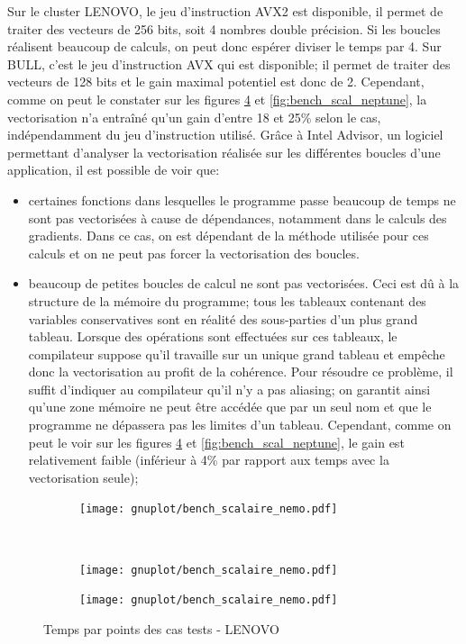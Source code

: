Sur le cluster LENOVO, le jeu d'instruction AVX2 est disponible, il permet de traiter des vecteurs de 256 bits, soit 4 nombres double précision. Si les boucles réalisent beaucoup de calculs, on peut donc espérer diviser le temps par 4. Sur BULL, c'est le jeu d'instruction AVX qui est disponible; il permet de traiter des vecteurs de 128 bits et le gain maximal potentiel est donc de 2. Cependant, comme on peut le constater sur les figures \ref{fig:bench_scal_nemo} et \ref{fig:bench_scal_neptune}, la vectorisation n'a entraîné qu'un gain d'entre 18 et 25\% selon le cas, indépendamment du jeu d'instruction utilisé. Grâce à Intel Advisor, un logiciel permettant d'analyser la vectorisation réalisée sur les différentes boucles d'une application, il est possible de voir que:
\begin{itemize}
\item certaines fonctions dans lesquelles le programme passe beaucoup de temps ne sont pas vectorisées à cause de dépendances, notamment dans le calculs des gradients. Dans ce cas, on est dépendant de la méthode utilisée pour ces calculs et on ne peut pas forcer la vectorisation des boucles.
\item beaucoup de petites boucles de calcul ne sont pas vectorisées. Ceci est dû à la structure de la mémoire du programme; tous les tableaux contenant des variables conservatives sont en réalité des sous-parties d'un plus grand tableau. Lorsque des opérations sont effectuées sur ces tableaux, le compilateur suppose qu'il travaille sur un unique grand tableau et empêche donc la vectorisation au profit de la cohérence. Pour résoudre ce problème, il suffit d'indiquer au compilateur qu'il n'y a pas aliasing; on garantit ainsi qu'une zone mémoire ne peut être accédée que par un seul nom et que le programme ne dépassera pas les limites d'un tableau. Cependant, comme on peut le voir sur les figures \ref{fig:bench_scal_nemo} et \ref{fig:bench_scal_neptune}, le gain est relativement faible (inférieur à 4\% par rapport aux temps avec la vectorisation seule); 
\end{itemize}



\begin{figure}[!ht]
  \centering
  \begin{subfigure}[b]{0.5\textwidth}
    \centering
    \texttt{[image: gnuplot/bench\_scalaire\_nemo.pdf]}
  \caption{\label{fig:bench_scal_nemo_nonper}}
  \end{subfigure}%
  ~
  \begin{subfigure}[b]{0.5\textwidth}
    \centering
    \texttt{[image: gnuplot/bench\_scalaire\_nemo.pdf]}
  \caption{\label{fig:bench_scal_nemo_sym}}
  \end{subfigure}
  \begin{subfigure}[b]{0.5\textwidth}
    \centering
    \texttt{[image: gnuplot/bench\_scalaire\_nemo.pdf]}
  \caption{\label{fig:bench_scal_nemo_per}}
  \end{subfigure}
  \caption{\label{fig:bench_scal_nemo}Temps par points des cas tests - LENOVO}
\end{figure}



